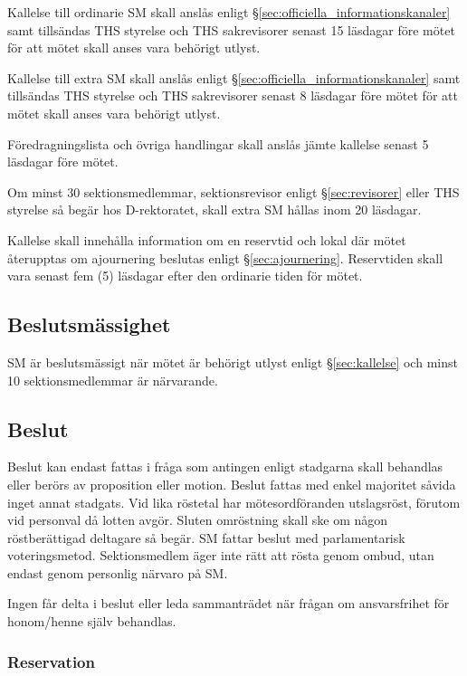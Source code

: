 \documentclass{dgovdoc}
\begin{document}
Kallelse till ordinarie SM skall anslås enligt
\S\ref{sec:officiella_informationskanaler} samt tillsändas THS styrelse och THS
sakrevisorer senast 15 läsdagar före mötet för att mötet skall anses vara
behörigt utlyst.

Kallelse till extra SM skall anslås enligt
\S\ref{sec:officiella_informationskanaler} samt tillsändas THS styrelse och THS
sakrevisorer senast 8 läsdagar före mötet för att mötet skall anses vara
behörigt utlyst.

Föredragningslista och övriga handlingar skall anslås jämte kallelse senast
5 läsdagar före mötet.

Om minst 30 sektionsmedlemmar, sektionsrevisor enligt \S\ref{sec:revisorer} eller
THS styrelse så begär hos D-rektoratet, skall extra SM hållas inom 20 läsdagar.

Kallelse skall innehålla information om en reservtid och lokal där mötet
återupptas om ajournering beslutas enligt \S\ref{sec:ajournering}. Reservtiden
skall vara senast fem (5) läsdagar efter den ordinarie tiden för mötet.

\subsection{Beslutsmässighet}

SM är beslutsmässigt när mötet är behörigt utlyst enligt 
\S\ref{sec:kallelse} och minst 10 sektionsmedlemmar är närvarande.

\subsection{Beslut}

Beslut kan endast fattas i fråga som antingen enligt stadgarna skall behandlas
eller berörs av proposition eller motion. Beslut fattas med enkel majoritet
såvida inget annat stadgats. Vid lika röstetal har mötesordföranden
utslagsröst, förutom vid personval då lotten avgör. Sluten omröstning skall ske
om någon röstberättigad deltagare så begär. SM fattar beslut med parlamentarisk
voteringsmetod. Sektionsmedlem äger inte rätt att rösta genom ombud, utan
endast genom personlig närvaro på SM.

Ingen får delta i beslut eller leda sammanträdet när frågan om ansvarsfrihet
för honom/henne själv behandlas.

\subsubsection{Reservation}
\end{document}

